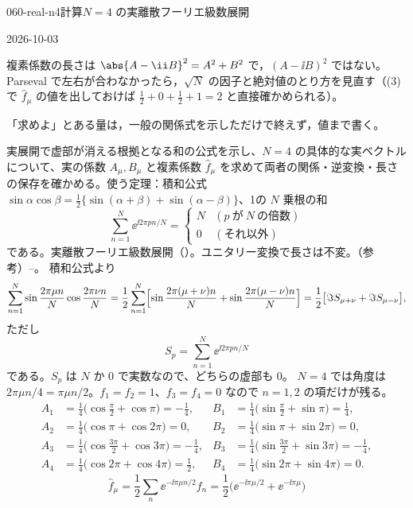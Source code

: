 \documentclass[uplatex,dvipdfmx,a4paper,11pt]{jsarticle}
\begin{document}
\begin{mondai}{060-real-n4}{計算}{$N=4$ の実離散フーリエ級数展開}
\begin{kizuki}
\end{kizuki}
\begin{maekizuki}{2026-10-03}
\item 複素係数の長さは $\abs{A-\ii B}^{2}=A^{2}+B^{2}$ で，$(A-\ii B)^{2}$ ではない。Parseval で左右が合わなかったら，$\sqrt{N}$ の因子と絶対値のとり方を見直す（(3) で $\hat{f}_{\mu}$ の値を出しておけば $\frac{1}{2}+0+\frac{1}{2}+1=2$ と直接確かめられる）。
\item 「求めよ」とある量は，一般の関係式を示しただけで終えず，値まで書く。
\end{maekizuki}
\begin{tadashii}
\houshin 実展開で虚部が消える根拠となる和の公式を示し、$N=4$ の具体的な実ベクトルについて、実の係数 $A_{\mu},B_{\mu}$ と複素係数 $\hat{f}_{\mu}$ を求めて両者の関係・逆変換・長さの保存を確かめる。使う定理：積和公式 $\sin\alpha\cos\beta=\frac{1}{2}\{\sin(\alpha+\beta)+\sin(\alpha-\beta)\}$、1の $N$ 乗根の和
\[
\sum_{n=1}^{N}\ee^{\ii2\pi pn/N}=
\begin{cases}N&(p\ \text{が}\ N\ \text{の倍数})\\0&(\text{それ以外})\end{cases}
\]
である。実離散フーリエ級数展開（）。ユニタリー変換で長さは不変。（参考）--。 %
\keisan
{} 積和公式より
\[
\sum_{n=1}^{N}\sin\frac{2\pi\mu n}{N}\cos\frac{2\pi\nu n}{N}=\frac{1}{2}\sum_{n=1}^{N}\Bigl[\sin\frac{2\pi(\mu+\nu)n}{N}+\sin\frac{2\pi(\mu-\nu)n}{N}\Bigr]=\frac{1}{2}\bigl[\Im S_{\mu+\nu}+\Im S_{\mu-\nu}\bigr],
\]
ただし
\[
S_p=\sum_{n=1}^{N}\ee^{\ii2\pi pn/N}
\]
である。$S_p$ は $N$ か $0$ で実数なので、どちらの虚部も $0$。
 $N=4$ では角度は $2\pi\mu n/4=\pi\mu n/2$。$f_1=f_2=1$、$f_3=f_4=0$ なので $n=1,2$ の項だけが残る。
\begin{align*}
A_1&=\tfrac{1}{4}\bigl(\cos\tfrac{\pi}{2}+\cos\pi\bigr)=-\tfrac{1}{4}, & B_1&=\tfrac{1}{4}\bigl(\sin\tfrac{\pi}{2}+\sin\pi\bigr)=\tfrac{1}{4},\\
A_2&=\tfrac{1}{4}\bigl(\cos\pi+\cos2\pi\bigr)=0, & B_2&=\tfrac{1}{4}\bigl(\sin\pi+\sin2\pi\bigr)=0,\\
A_3&=\tfrac{1}{4}\bigl(\cos\tfrac{3\pi}{2}+\cos3\pi\bigr)=-\tfrac{1}{4}, & B_3&=\tfrac{1}{4}\bigl(\sin\tfrac{3\pi}{2}+\sin3\pi\bigr)=-\tfrac{1}{4},\\
A_4&=\tfrac{1}{4}\bigl(\cos2\pi+\cos4\pi\bigr)=\tfrac{1}{2}, & B_4&=\tfrac{1}{4}\bigl(\sin2\pi+\sin4\pi\bigr)=0.
\end{align*}
\[
\hat{f}_{\mu}=\frac{1}{2}\sum_{n}\ee^{-\ii\pi\mu n/2}f_n=\frac{1}{2}\bigl(\ee^{-\ii\pi\mu/2}+\ee^{-\ii\pi\mu}\bigr)
\]
\end{tadashii}
\end{mondai}
\end{document}
